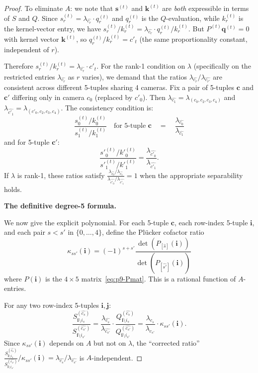 \begin{proof}
To eliminate $A$: we note that $\mathbf{s}^{(t)}$ and $\mathbf{k}^{(t)}$ are
\emph{both} expressible in terms of $S$ and $Q$. Since $s^{(t)}_r = \lambda_{\widehat{c_r}}\cdot q^{(t)}_r$
and $q^{(t)}_r$ is the $Q$-evaluation, while $k^{(t)}_r$ is the kernel-vector entry,
we have $s^{(t)}_r / k^{(t)}_r = \lambda_{\widehat{c_r}}\cdot q^{(t)}_r / k^{(t)}_r$.
But $P^{(t)}\mathbf{q}^{(t)} = 0$ with kernel vector $\mathbf{k}^{(t)}$,
so $q^{(t)}_r / k^{(t)}_r = c'_t$ (the same proportionality constant,
independent of $r$).

Therefore $s^{(t)}_r / k^{(t)}_r = \lambda_{\widehat{c_r}}\cdot c'_t$. For the
rank-1 condition on $\lambda$ (specifically on the restricted entries $\lambda_{\widehat{c_r}}$
as $r$ varies), we demand that the ratios
$\lambda_{\widehat{c_r}}/\lambda_{\widehat{c_{r'}}}$ are consistent across
different 5-tuples sharing 4 cameras. Fix a pair of 5-tuples $\mathbf{c}$ and
$\mathbf{c}'$ differing only in camera $c_0$ (replaced by $c'_0$).
Then $\lambda_{\widehat{c_1}} = \lambda_{(c_0,c_2,c_3,c_4)}$
and $\lambda_{\widehat{c'_1}} = \lambda_{(c'_0,c_2,c_3,c_4)}$.
The consistency condition is:
\[
  \frac{s^{(t)}_0 / k^{(t)}_0}{s^{(t)}_1 / k^{(t)}_1}
  \quad\text{for 5-tuple } \mathbf{c} \quad=\quad
  \frac{\lambda_{\widehat{c_0}}}{\lambda_{\widehat{c_1}}}
\]
and for 5-tuple $\mathbf{c}'$:
\[
  \frac{s'^{(t)}_0 / k'^{(t)}_0}{s'^{(t)}_1 / k'^{(t)}_1}
  = \frac{\lambda_{\widehat{c'_0}}}{\lambda_{\widehat{c'_1}}}.
\]
If $\lambda$ is rank-1, these ratios satisfy
$\frac{\lambda_{\widehat{c_0}}/\lambda_{\widehat{c_1}}}
{\lambda_{\widehat{c'_0}}/\lambda_{\widehat{c'_1}}} = 1$
when the appropriate separability holds.

\medskip
\textbf{The definitive degree-5 formula.}

We now give the explicit polynomial. For each 5-tuple $\mathbf{c}$, each
row-index 5-tuple $\mathbf{i}$, and each pair $s<s'$ in $\{0,\ldots,4\}$,
define the Pl\"ucker cofactor ratio
\[
  \kappa_{ss'}(\mathbf{i}) = (-1)^{s+s'}\frac{
  \det(P_{[\widehat{s}]}(\mathbf{i}))}{
  \det(P_{[\widehat{s'}]}(\mathbf{i}))}
\]
where $P(\mathbf{i})$ is the $4\times 5$ matrix~\eqref{eq:p9-Pmat}.
This is a rational function of $A$-entries.

For any two row-index 5-tuples $\mathbf{i},\mathbf{j}$:
\[
  \frac{S^{(\widehat{c_s})}_{\mathbf{i}\setminus i_s}}{S^{(\widehat{c_{s'}})}_{\mathbf{i}\setminus i_{s'}}}
  = \frac{\lambda_{\widehat{c_s}}}{\lambda_{\widehat{c_{s'}}}}\cdot
  \frac{Q^{(\widehat{c_s})}_{\mathbf{i}\setminus i_s}}{Q^{(\widehat{c_{s'}})}_{\mathbf{i}\setminus i_{s'}}}
  = \frac{\lambda_{\widehat{c_s}}}{\lambda_{\widehat{c_{s'}}}}\cdot \kappa_{ss'}(\mathbf{i}).
\]
Since $\kappa_{ss'}(\mathbf{i})$ depends on $A$ but not on $\lambda$,
the ``corrected ratio'' $\frac{S^{(\widehat{c_s})}_{\mathbf{i}\setminus i_s}}
{S^{(\widehat{c_{s'}})}_{\mathbf{i}\setminus i_{s'}}}/\kappa_{ss'}(\mathbf{i})
= \lambda_{\widehat{c_s}}/\lambda_{\widehat{c_{s'}}}$ is $A$-independent.


\end{proof}
